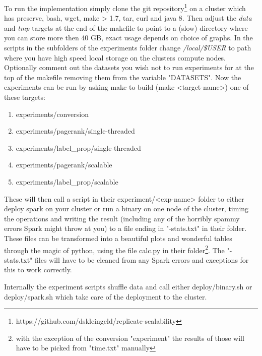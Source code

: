 To run the implementation simply clone the git repository\footnote{https://github.com/dskleingeld/replicate-scalability} on a cluster which has preserve, bash, wget, make > 1.7, tar, curl and java 8. Then adjust the \textit{data} and \textit{tmp} targets at the end of the makefile to point to a (slow) directory where you can store more then 40 GB, exact usage depends on choice of graphs. In the scripts in the subfolders of the experiments folder change \textit{/local/\$USER} to path where you have high speed local storage on the clusters compute nodes. Optionally comment out the datasets you wish not to run experiments for at the top of the makefile removing them from the variable "DATASETS". Now the experiments can be run by asking make to build (make <target-name>) one of these targets:

\begin{enumerate}
	\item experiments/conversion
	\item experiments/pagerank/single-threaded
	\item experiments/label\_prop/single-threaded
	\item experiments/pagerank/scalable
	\item experiments/label\_prop/scalable
\end{enumerate}

These will then call a script in their experiment/<exp-name> folder to either deploy spark on your cluster or run a binary on one node of the cluster, timing the operations and writing the result (including any of the horribly spammy errors Spark might throw at you) to a file ending in "-stats.txt" in their folder. These files can be transformed into a beautiful plots and wonderful tables through the magic of python, using the file calc.py in their folder\footnote{with the exception of the conversion "experiment" the results of those will have to be picked from "time.txt" manually}. The "-stats.txt" files will have to be cleaned from any Spark errors and exceptions for this to work correctly. 

Internally the experiment scripts shuffle data and call either deploy/binary.sh or deploy/spark.sh which take care of the deployment to the cluster. 
